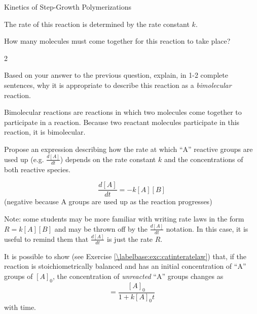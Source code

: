 \begin{activity}{Kinetics of Step-Growth Polymerizations}
\begin{model}
	The rate of this reaction is determined by the rate constant $k$.

\end{model}


\begin{ctqs}

	\question How many molecules must come together for this reaction to take place?
	
		\begin{solution}[0.5in]{}
			2
		\end{solution}
	
	\question Based on your answer to the previous question, explain, in 1-2 complete sentences, why it is appropriate to describe this reaction as a \emph{bimolecular} reaction.
	
		\begin{solution}[1in]{}
			Bimolecular reactions are reactions in which two molecules come together to participate in a reaction.  Because two reactant molecules participate in this reaction, it is bimolecular.
		\end{solution}
	
	\question Propose an expression describing how the rate at which ``A'' reactive groups are used up (e.g. $\frac{d[A]}{dt}$) depends on the rate constant $k$ and the concentrations of both reactive species.
		\label{\labelbase:ctq:proposeratelaw}
		
		\begin{solution}[1in]{}
			\begin{equation*}
				\frac{d[A]}{dt} = -k[A][B]
			\end{equation*}
			(negative because A groups are used up as the reaction progresses)
			
			Note: some students may be more familiar with writing rate laws in the form $R = k[A][B]$ and may be thrown off by the $\frac{d[A]}{dt}$ notation.  In this case, it is useful to remind them that $\frac{d[A]}{dt}$ is just the rate $R$.
			
		\end{solution}
		
\end{ctqs}

\begin{infobox}
	It is possible to show (see Exercise \ref{\labelbase:exc:catinteratelaw}) that, if the reaction is stoichiometrically balanced and has an initial concentration of ``A'' groups of $[A]_0$, the concentration of \emph{unreacted} ``A'' groups changes as
	\begin{equation*}
		[A] = \frac{[A]_0}{1 + k[A]_0 t}
	\end{equation*}	
	with time.
	\label{\labelbase:infobox:catintegrated}
\end{infobox}


\end{activity}
